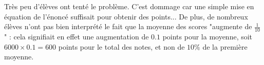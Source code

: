 Très peu d'élèves ont tenté le problème. C'est dommage car une simple mise en équation de l'énoncé suffisait pour obtenir des points... De plus, de nombreux élèves n'ont pas bien interprété le fait que la moyenne des scores "augmente de $\frac 1{10}$" : cela signifiait en effet une augmentation de $0.1$ points pour la moyenne, soit $6000\times 0.1=600$ points pour le total des notes, et non de $10 \%$ de la première moyenne.